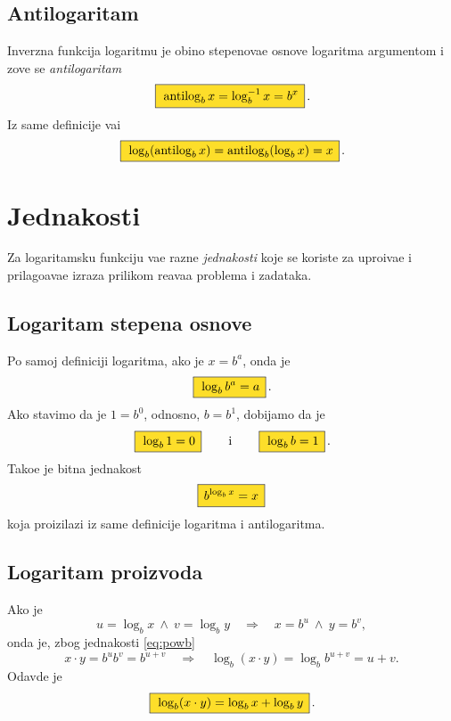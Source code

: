 \documentclass[12pt, twoside, a4paper]{article}
\def\land{\mathbin{\>\wedge\>}}
\def\logb{\log_b}
\def\okvir#1{\,\fcolorbox{black}{Goldenrod}{$\,\displaystyle{\mathstrut #1}\,$}\,}
\def\sledi{{\quad\Rightarrow\quad}}
\begin{document}
\subsection{Antilogaritam}

\def\antilog{\mathop{\rm antilog}\nolimits}
Inverzna funkcija logaritmu
je obi{\cv}no stepenova{\nj}e osnove logaritma argumentom i zove se {\sl antilogaritam}
\begin{equation}
\okvir{\antilog_b x = \logb^{-1}x =  b^x}.
\end{equation}
Iz same definicije va{\zv}i
\begin{equation}
\okvir{\log_b(\antilog_b x)=\antilog_b(\log_b x)=x}.
\end{equation}



\section{Jednakosti}

Za logaritamsku funkciju va{\zv}e razne {\sl jednakosti\/} koje se koriste za 
upro{\sv}{\cc}iva{\nj}e i pri\-la\-go\-{\dj}a\-va\-{\nj}e izraza prilikom re{\sv}ava{\nj}a
problema i zadataka.

\subsection{Logaritam stepena osnove}

Po samoj definiciji logaritma, ako je $x=b^a$, onda je
\begin{equation}
\okvir{\logb b^a=a}.
\label{eq:powb}
\end{equation}
Ako stavimo da je $1=b^0$, odnosno, $b=b^1$, dobijamo da je
\begin{equation}
\okvir{\logb 1=0}\qquad\text{i}\qquad\okvir{\logb b=1}.
\end{equation}
Tako{\dj}e je bitna jednakost
\begin{equation}
\okvir{b^{\logb x}=x}
\end{equation}
koja proizilazi iz same definicije logaritma i antilogaritma.

\subsection{Logaritam proizvoda}

Ako je
$$
u=\logb x\land v=\log_b y \sledi x=b^u\land y=b^v,
$$
onda je, zbog jednakosti \eqref{eq:powb}
$$
x\cdot y=b^ub^v=b^{u+v}\sledi \logb(x\cdot y)=\logb b^{u+v}=u+v.
$$
Odavde je
\begin{equation}
\okvir{\logb(x\cdot y)=\logb x+\logb y}.
\label{eq:lnmul}
\end{equation}
\end{document}
